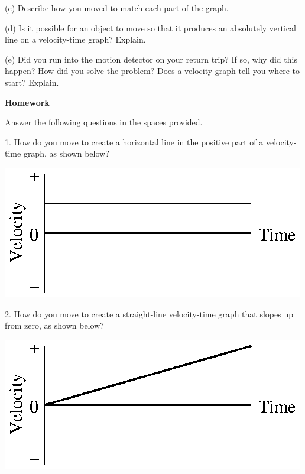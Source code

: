 (c) Describe how you moved to match each part of the graph.
\vspace{20mm}

(d) Is it possible for an object to move so that it produces an absolutely vertical
line on a velocity-time graph? Explain.
\vspace{20mm}

(e) Did you run into the motion detector on your return trip? If so, why did
this happen? How did you solve the problem? Does a velocity graph tell you where
to start? Explain.
\vspace{20mm}

\textbf{Homework} 

Answer the following questions in the spaces provided.

1. How do you move to create a horizontal line in the positive part of a velocity-time
graph, as shown below?

\vspace{0.3cm}
{\par\raggedright \includegraphics{velocity/velocity_fig8.eps} \par}
\vspace{0.3cm}

2. How do you move to create a straight-line velocity-time graph that slopes
up from zero, as shown below?

\vspace{0.3cm}
{\par\raggedright \includegraphics{velocity/velocity_fig9.eps} \par}
\vspace{0.3cm}

